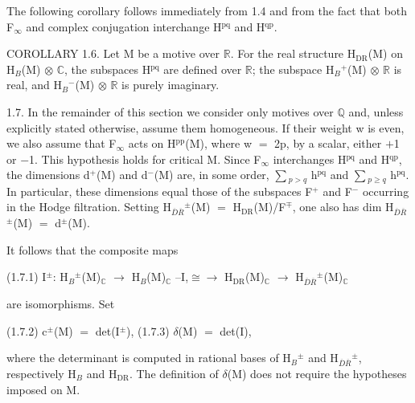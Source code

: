 \documentclass[10pt,twoside]{article}
\begin{document}
The following corollary follows immediately from 1.4 and from the fact that both F\ensuremath{_{∞}} and complex conjugation interchange H\ensuremath{^{\mathrm{pq}}} and H\ensuremath{^{\mathrm{qp}}}.\par
COROLLARY 1.6. Let M be a motive over \ensuremath{ℝ}. For the real structure H\ensuremath{_{\mathrm{DR}}}(M) on H\ensuremath{_{B}}(M) \ensuremath{⊗} \ensuremath{ℂ}, the subspaces H\ensuremath{^{\mathrm{pq}}} are defined over \ensuremath{ℝ}; the subspace H\ensuremath{_{B}}\ensuremath{^{+}}(M) \ensuremath{⊗} \ensuremath{ℝ} is real, and H\ensuremath{_{B}}\ensuremath{^{−}}(M) \ensuremath{⊗} \ensuremath{ℝ} is purely imaginary.\par
1.7. In the remainder of this section we consider only motives over \ensuremath{ℚ} and, unless explicitly stated otherwise, assume them homogeneous. If their weight w is even, we also assume that F\ensuremath{_{∞}} acts on H\ensuremath{^{\mathrm{pp}}}(M), where w \ensuremath{=} 2p, by a scalar, either \ensuremath{+}1 or \ensuremath{−}1. This hypothesis holds for critical M. Since F\ensuremath{_{∞}} interchanges H\ensuremath{^{\mathrm{pq}}} and H\ensuremath{^{\mathrm{qp}}}, the dimensions d\ensuremath{^{+}}(M) and d\ensuremath{^{−}}(M) are, in some order, \ensuremath{∑}\ensuremath{_{p>q}} h\ensuremath{^{\mathrm{pq}}} and \ensuremath{∑}\ensuremath{_{p≥q}} h\ensuremath{^{\mathrm{pq}}}. In particular, these dimensions equal those of the subspaces F\ensuremath{^{+}} and F\ensuremath{^{−}} occurring in the Hodge filtration. Setting H\ensuremath{_{\overline{D}\overline{R}}}\ensuremath{^{±}}(M) \ensuremath{=} H\ensuremath{_{\mathrm{DR}}}(M)/F\ensuremath{^{∓}}, one also has dim H\ensuremath{_{\overline{D}\overline{R}}}\ensuremath{^{±}}(M) \ensuremath{=} d\ensuremath{^{±}}(M).\par
It follows that the composite maps\par
(1.7.1)    I\ensuremath{^{±}}: H\ensuremath{_{B}}\ensuremath{^{±}}(M)\ensuremath{_{ℂ}} \ensuremath{→} H\ensuremath{_{B}}(M)\ensuremath{_{ℂ}} --I,\ensuremath{≅}\ensuremath{→} H\ensuremath{_{\mathrm{DR}}}(M)\ensuremath{_{ℂ}} \ensuremath{→} H\ensuremath{_{\overline{D}\overline{R}}}\ensuremath{^{±}}(M)\ensuremath{_{ℂ}}\par
are isomorphisms. Set\par
(1.7.2)    c\ensuremath{^{±}}(M) \ensuremath{=} det(I\ensuremath{^{±}}), (1.7.3)    \ensuremath{δ}(M) \ensuremath{=} det(I),\par
where the determinant is computed in rational bases of H\ensuremath{_{B}}\ensuremath{^{±}} and H\ensuremath{_{\overline{D}\overline{R}}}\ensuremath{^{±}}, respectively H\ensuremath{_{B}} and H\ensuremath{_{\mathrm{DR}}}. The definition of \ensuremath{δ}(M) does not require the hypotheses imposed on M.\par
\end{document}
